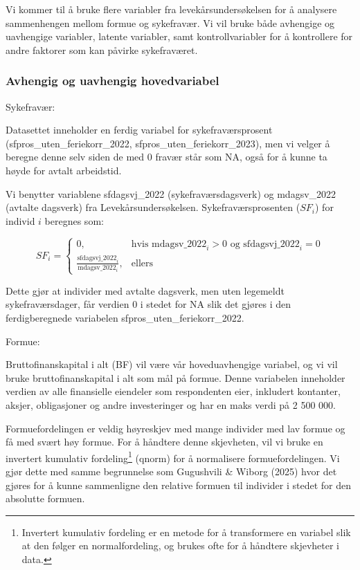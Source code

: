 \documentclass[
  12pt,
  a4paper,
  DIV=11,
  numbers=noendperiod]{scrartcl}
\begin{document}
Vi kommer til å bruke flere variabler fra levekårsundersøkelsen for å
analysere sammenhengen mellom formue og sykefravær. Vi vil bruke både
avhengige og uavhengige variabler, latente variabler, samt
kontrollvariabler for å kontrollere for andre faktorer som kan påvirke
sykefraværet.

\subsubsection{Avhengig og uavhengig
hovedvariabel}\label{avhengig-og-uavhengig-hovedvariabel}

Sykefravær:

Datasettet inneholder en ferdig variabel for sykefraværsprosent
(sfpros\_uten\_feriekorr\_2022, sfpros\_uten\_feriekorr\_2023), men vi
velger å beregne denne selv siden de med 0 fravær står som NA, også for
å kunne ta høyde for avtalt arbeidstid.

Vi benytter variablene sfdagsvj\_2022 (sykefraværsdagsverk) og
mdagsv\_2022 (avtalte dagsverk) fra Levekårsundersøkelsen.
Sykefraværsprosenten (\(SF_i\)) for individ \(i\) beregnes som:

\[
SF_i = 
\begin{cases}
0, & \text{hvis } \mathrm{mdagsv\_2022}_i > 0 \text{ og } \mathrm{sfdagsvj\_2022}_i = 0 \\
\frac{ \mathrm{sfdagsvj\_2022}_i }{ \mathrm{mdagsv\_2022}_i }, & \text{ellers}
\end{cases}
\]

Dette gjør at individer med avtalte dagsverk, men uten legemeldt
sykefraværsdager, får verdien 0 i stedet for NA slik det gjøres i den
ferdigberegnede variabelen sfpros\_uten\_feriekorr\_2022.

Formue:

Bruttofinanskapital i alt (BF) vil være vår hoveduavhengige variabel, og
vi vil bruke bruttofinanskapital i alt som mål på formue. Denne
variabelen inneholder verdien av alle finansielle eiendeler som
respondenten eier, inkludert kontanter, aksjer, obligasjoner og andre
investeringer og har en maks verdi på 2 500 000.

Formuefordelingen er veldig høyreskjev med mange individer med lav
formue og få med svært høy formue. For å håndtere denne skjevheten, vil
vi bruke en invertert kumulativ fordeling\footnote{Invertert kumulativ
  fordeling er en metode for å transformere en variabel slik at den
  følger en normalfordeling, og brukes ofte for å håndtere skjevheter i
  data.} (qnorm) for å normalisere formuefordelingen. Vi gjør dette med
samme begrunnelse som Gugushvili \& Wiborg (2025) hvor det gjøres for å
kunne sammenligne den relative formuen til individer i stedet for den
absolutte formuen.
\end{document}
